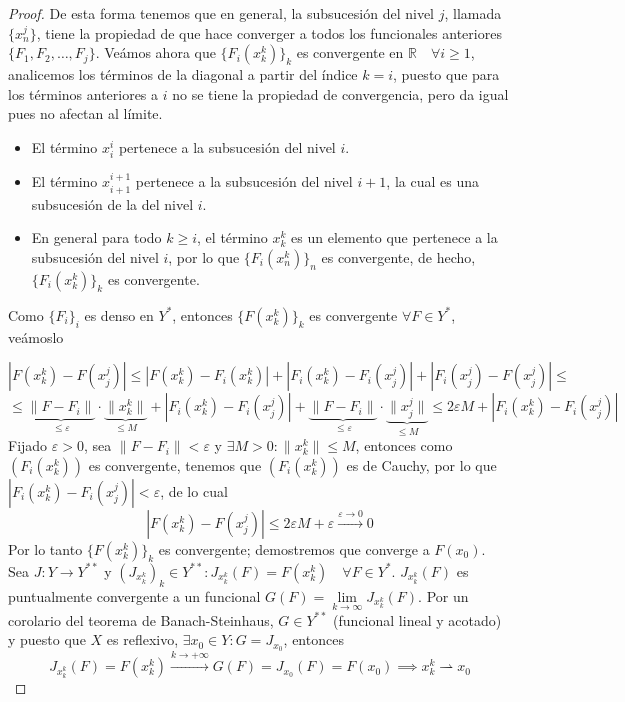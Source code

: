 \begin{teo}[Eberlein]
\begin{proof}
    \noindent
    De esta forma tenemos que en general, la subsucesión del nivel $j$, llamada $\{x_n^j\}$, tiene la propiedad de que hace converger a todos los funcionales anteriores $\{F_1, F_2, \dots, F_j\}$. Veámos ahora que $\{F_i(x_k^k)\}_k$ es convergente en $\mathbb{R} \quad \forall i \ge 1$, analicemos los términos de la diagonal a partir del índice $k = i$, puesto que para los términos anteriores a $i$ no se tiene la propiedad de convergencia, pero da igual pues no afectan al límite.
    \begin{itemize}
        \item El término $x_i^i$ pertenece a la subsucesión del nivel $i$.
        \item El término $x_{i+1}^{i+1}$ pertenece a la subsucesión del nivel $i+1$, la cual es una subsucesión de la del nivel $i$.
        \item En general para todo $k \ge i$, el término $x_k^k$ es un elemento que pertenece a la subsucesión del nivel $i$, por lo que $\{F_i(x_n^k)\}_n$ es convergente, de hecho, $\{F_i(x_k^k)\}_k$ es convergente. \\
    \end{itemize}
    Como $\{F_i\}_i$ es denso en $Y^*$, entonces $\{F(x_k^k)\}_k$ es convergente $\forall F \in Y^*$, veámoslo

    \[ |F(x_k^k) - F(x_j^j)| \le |F(x_k^k) - F_i(x_k^k)| + |F_i(x_k^k) - F_i(x_j^j)| + |F_i(x_j^j) - F(x_j^j)| \le \]
    \[ \le \underbrace{\|F - F_i\|}_{\le \varepsilon} \cdot \underbrace{\|x_k^k\|}_{\le M} + |F_i(x_k^k) - F_i(x_j^j)| + \underbrace{\|F - F_i\|}_{\le \varepsilon} \cdot \underbrace{\|x_j^j\|}_{\le M} \le 2\varepsilon M + |F_i(x_k^k) - F_i(x_j^j)| \]
    Fijado $\varepsilon > 0$, sea $\|F - F_i\| < \varepsilon$ y $\exists M > 0 : \|x_k^k\| \le M$, entonces como $(F_i(x_k^k))$ es convergente, tenemos que $(F_i(x_k^k))$ es de Cauchy, por lo que $|F_i(x_k^k) - F_i(x_j^j)| < \varepsilon$, de lo cual
    \begin{equation*}
        |F(x_k^k) - F(x_j^j)| \le 2\varepsilon M + \varepsilon \xrightarrow{\varepsilon \to 0} 0
    \end{equation*}
    Por lo tanto $\{F(x_k^k)\}_k$ es convergente; demostremos que converge a $F(x_0)$. \\

    \noindent
    Sea $J: Y \to Y^{**}$ y $(J_{x_k^k})_k \in Y^{**} : J_{x_k^k}(F) = F(x_k^k) \quad \forall F \in Y^*$. $J_{x_k^k}(F)$ es puntualmente convergente a un funcional  $G(F) = \lim\limits_{k \to \infty} J_{x_k^k}(F)$. Por un corolario del teorema de Banach-Steinhaus, $G \in Y^{**}$ (funcional lineal y acotado) y puesto que $X$ es reflexivo, $\exists x_0 \in Y : G = J_{x_0}$, entonces
    \[ J_{x_k^k}(F) = F(x_k^k) \xrightarrow{k \to +\infty} G(F)=J_{x_0}(F)=F(x_0)  \implies x_k^k \rightharpoonup x_0 \]
\end{proof}
\end{teo}

